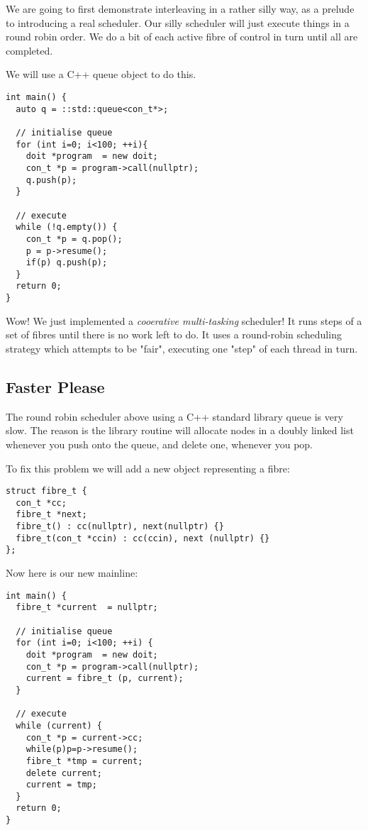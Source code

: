 \documentclass[oneside]{book}
\begin{document}
We are going to first demonstrate interleaving in a rather silly way,
as a prelude to introducing a real scheduler. Our silly scheduler
will just execute things in a round robin order. We do a bit of each
active  fibre of control in turn until all are completed.

We will use a C++ queue object to do this.

\begin{verbatim}
int main() {
  auto q = ::std::queue<con_t*>;

  // initialise queue
  for (int i=0; i<100; ++i){
    doit *program  = new doit;
    con_t *p = program->call(nullptr);
    q.push(p);   
  }

  // execute
  while (!q.empty()) {
    con_t *p = q.pop();
    p = p->resume();
    if(p) q.push(p);
  }
  return 0;
}
\end{verbatim}

Wow! We just implemented a {\em cooerative multi-tasking} scheduler! It runs steps of a
set of fibres until there is no work left to do. It uses a round-robin
scheduling strategy which attempts to be "fair", executing one "step" 
of each thread in turn. 

\subsection{Faster Please}
The round robin scheduler above using a C++ standard library queue is very slow.
The reason is the library routine will allocate nodes in a doubly linked list
whenever you push onto the queue, and delete one, whenever you pop.

To fix this problem we will add a new object representing a fibre:

\begin{verbatim}
struct fibre_t {
  con_t *cc;
  fibre_t *next;
  fibre_t() : cc(nullptr), next(nullptr) {}
  fibre_t(con_t *ccin) : cc(ccin), next (nullptr) {}
};
\end{verbatim}

Now here is our new mainline:

\begin{verbatim}
int main() {
  fibre_t *current  = nullptr;

  // initialise queue
  for (int i=0; i<100; ++i) {
    doit *program  = new doit;
    con_t *p = program->call(nullptr);
    current = fibre_t (p, current);
  }

  // execute
  while (current) {
    con_t *p = current->cc;
    while(p)p=p->resume();
    fibre_t *tmp = current;
    delete current;
    current = tmp;
  }
  return 0;
}
\end{verbatim}
\end{document}
